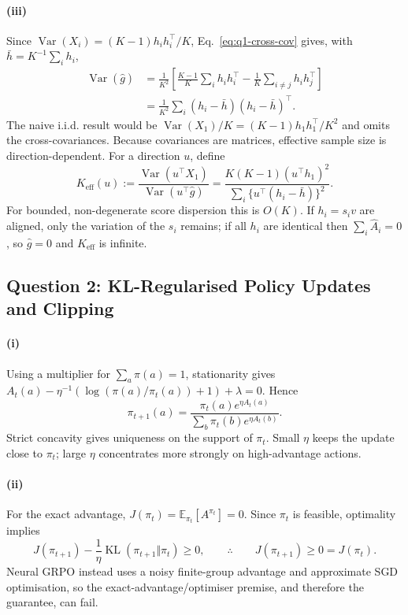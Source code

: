 \paragraph{(iii)}
Since $\operatorname{Var}(X_i)=(K-1)h_i h_i^\top/K$, Eq.~\eqref{eq:q1-cross-cov}
gives, with $\bar h=K^{-1}\sum_i h_i$,
\begin{align}
 \operatorname{Var}(\hat g)
 &=\frac{1}{K^2}\left[\frac{K-1}{K}\sum_i h_i h_i^\top
 -\frac{1}{K}\sum_{i\ne j}h_i h_j^\top\right]\\
 &=\frac{1}{K^2}\sum_i(h_i-\bar h)(h_i-\bar h)^\top .
 \label{eq:q1-var-g}
\end{align}
The naive i.i.d. result would be
$\operatorname{Var}(X_1)/K=(K-1)h_1h_1^\top/K^2$ and omits the cross-covariances.
Because covariances are matrices, effective sample size is direction-dependent.  For a
direction $u$, define
\begin{equation}
 K_{\mathrm{eff}}(u)
 :=\frac{\operatorname{Var}(u^\top X_1)}
          {\operatorname{Var}(u^\top\hat g)}
 =\frac{K(K-1)(u^\top h_1)^2}
        {\sum_i\{u^\top(h_i-\bar h)\}^2}.
\end{equation}
For bounded, non-degenerate score dispersion this is $O(K)$.  If $h_i=s_i v$ are
aligned, only the variation of the $s_i$ remains; if all $h_i$ are identical then
$\sum_i\hat A_i=0$, so $\hat g=0$ and $K_{\mathrm{eff}}$ is infinite.

\subsection{Question 2: KL-Regularised Policy Updates and Clipping}

\paragraph{(i)}
Using a multiplier for $\sum_a\pi(a)=1$, stationarity gives
$A_t(a)-\eta^{-1}(\log(\pi(a)/\pi_t(a))+1)+\lambda=0$.  Hence
\begin{equation}
 \boxed{\displaystyle
 \pi_{t+1}(a)=
 \frac{\pi_t(a)e^{\eta A_t(a)}}{\sum_b\pi_t(b)e^{\eta A_t(b)}} .}
 \label{eq:exponentiated-update}
\end{equation}
Strict concavity gives uniqueness on the support of $\pi_t$.  Small $\eta$ keeps the
update close to $\pi_t$; large $\eta$ concentrates more strongly on high-advantage actions.

\paragraph{(ii)}
For the exact advantage, $J(\pi_t)=\mathbb{E}_{\pi_t}[A^{\pi_t}]=0$.  Since $\pi_t$ is
feasible, optimality implies
\begin{equation}
 J(\pi_{t+1})-\frac{1}{\eta}\operatorname{KL}(\pi_{t+1}\Vert\pi_t)\ge0,
 \qquad\therefore\qquad J(\pi_{t+1})\ge0=J(\pi_t).
\end{equation}
Neural GRPO instead uses a noisy finite-group advantage and approximate SGD optimisation,
so the exact-advantage/optimiser premise, and therefore the guarantee, can fail.

